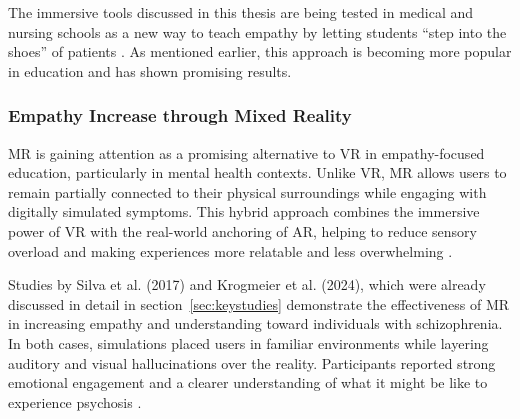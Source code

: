 
The immersive tools discussed in this thesis are being tested in medical and nursing schools as a new way to teach empathy by letting students “step into the shoes” of patients \cite{Alieldin2024}. As mentioned earlier, this approach is becoming more popular in education and has shown promising results.

\subsubsection{Empathy Increase through Mixed Reality}

MR is gaining attention as a promising alternative to VR in empathy-focused education, particularly in mental health contexts. Unlike VR, MR allows users to remain partially connected to their physical surroundings while engaging with digitally simulated symptoms. This hybrid approach combines the immersive power of VR with the real-world anchoring of AR, helping to reduce sensory overload and making experiences more relatable and less overwhelming \cite{Zare-Bidaki2022}.

Studies by Silva et al. (2017) and Krogmeier et al. (2024), which were already discussed in detail in section~\ref{sec:keystudies} demonstrate the effectiveness of MR in increasing empathy and understanding toward individuals with schizophrenia. In both cases, simulations placed users in familiar environments while layering auditory and visual hallucinations over the reality. Participants reported strong emotional engagement and a clearer understanding of what it might be like to experience psychosis \cite{Silva2017, Krogmeier2024}. 

